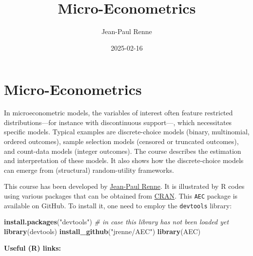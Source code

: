 \documentclass[
  12pt,
]{book}
\title{Micro-Econometrics}
\author{Jean-Paul Renne}
\date{2025-02-16}
\newenvironment{Shaded}{\begin{snugshade}}{\end{snugshade}}
\newcommand{\CommentTok}[1]{\textcolor[rgb]{0.56,0.35,0.01}{\textit{#1}}}
\newcommand{\FunctionTok}[1]{\textcolor[rgb]{0.13,0.29,0.53}{\textbf{#1}}}
\newcommand{\NormalTok}[1]{#1}
\newcommand{\StringTok}[1]{\textcolor[rgb]{0.31,0.60,0.02}{#1}}
\theoremstyle{definition}
\theoremstyle{definition}
\theoremstyle{definition}
\theoremstyle{definition}
\theoremstyle{remark}
\begin{document}
\maketitle

{
\setcounter{tocdepth}{1}
\tableofcontents
}
\newcommand{\bv}[1]{\mathbf{#1}}

\hypertarget{intro}{%
\chapter*{Micro-Econometrics}\label{intro}}

In microeconometric models, the variables of interest often feature restricted distributions---for instance with discontinuous support---, which necessitates specific models. Typical examples are discrete-choice models (binary, multinomial, ordered outcomes), sample selection models (censored or truncated outcomes), and count-data models (integer outcomes). The course describes the estimation and interpretation of these models. It also shows how the discrete-choice models can emerge from (structural) random-utility frameworks.

This course has been developed by \href{https://www.jprenne.com}{Jean-Paul Renne}. It is illustrated by R codes using various packages that can be obtained from \href{https://cran.r-project.org}{CRAN}. This \texttt{AEC} package is available on GitHub. To install it, one need to employ the \texttt{devtools} library:

\begin{Shaded}
\begin{Highlighting}[]
\FunctionTok{install.packages}\NormalTok{(}\StringTok{"devtools"}\NormalTok{) }\CommentTok{\# in case this library has not been loaded yet}
\FunctionTok{library}\NormalTok{(devtools)}
\FunctionTok{install\_github}\NormalTok{(}\StringTok{"jrenne/AEC"}\NormalTok{)}
\FunctionTok{library}\NormalTok{(AEC)}
\end{Highlighting}
\end{Shaded}

\textbf{Useful (R) links:}
\end{document}
